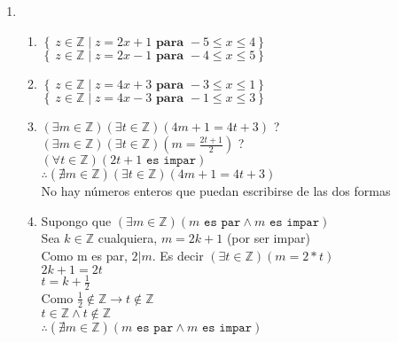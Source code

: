 \documentclass[11pt]{article}
\begin{document}
\begin{enumerate}
\item
\begin{enumerate}
	\item
		$\left\{\ z \in \mathbb{Z} \mid z = 2 x + 1 \textbf{  para  } -5 \leq x \leq 4 \right\}$\\
		$\left\{\ z \in \mathbb{Z} \mid z = 2 x - 1 \textbf{  para  } -4 \leq x \leq 5 \right\}$
	\item
		$\left\{\ z \in \mathbb{Z} \mid z = 4 x + 3 \textbf{  para  } -3 \leq x \leq 1 \right\}$\\
		$\left\{\ z \in \mathbb{Z} \mid z = 4 x - 3 \textbf{  para  } -1 \leq x \leq 3 \right\}$
	\item
		$\left(\exists m \in \mathbb{Z}\right)\left(\exists t \in \mathbb{Z}\right)\left(4m + 1 = 4 t + 3\right)$ ? \\
		$\left(\exists m \in \mathbb{Z}\right)\left(\exists t \in \mathbb{Z}\right)\left(m = \frac{2t + 1}{2}\right)$ ? \\
		$ \left(\forall t \in \mathbb{Z}\right)\left(2t + 1 \texttt{ es impar}\right)$\\
		$\therefore \left(\nexists m \in \mathbb{Z}\right)\left(\exists t \in \mathbb{Z}\right)\left(4m + 1 = 4 t + 3\right)$\\
		No hay números enteros que puedan escribirse de las dos formas
	\item Supongo que $\left(\exists m \in \mathbb{Z}\right)\left(m \texttt{ es par} \land m \texttt{ es impar}\right)$\\
	Sea $k \in \mathbb{Z}$ cualquiera, $m = 2k + 1$ (por ser impar)\\
	Como m es par, $2|m$. Es decir $\left(\exists t \in \mathbb{Z}\right)\left(m = 2*t\right)$\\
	$2k + 1 = 2t$\\
	$t = k + \frac{1}{2}$\\
	Como $\frac{1}{2} \not \in \mathbb{Z} \rightarrow t \not \in \mathbb{Z}$\\
	$t \in \mathbb{Z} \land t \not \in \mathbb{Z}$\\
	$\therefore \left(\nexists m \in \mathbb{Z}\right)\left(m \texttt{ es par} \land m \texttt{ es impar}\right)$
	  
\end{enumerate}

\end{enumerate}
\end{document}
